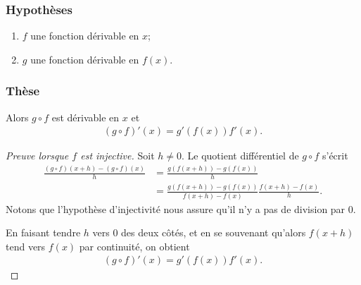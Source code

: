 \documentclass[main.tex]{subfiles}
\begin{document}
\begin{proposition}

    \subsubsection{Hypothèses}

    \begin{enumerate}
        \item $f$ une fonction dérivable en $x$;
        \item $g$ une fonction dérivable en $f(x)$.
    \end{enumerate}

    \subsubsection{Thèse}

    Alors $g \circ f$ est dérivable en $x$ et
    \begin{align}
        (g \circ f)'(x) = g'(f(x)) f'(x).
    \end{align}
\end{proposition}
\begin{proof}[Preuve lorsque $f$ est injective]
    Soit $h \neq 0$.
    Le quotient différentiel de $g \circ f$ s'écrit
    \begin{align}
        \frac {(g \circ f)(x + h) - (g \circ f)(x)} h
        &= \frac {g(f(x + h)) - g(f(x))} h\\
        &= \frac {g(f(x + h)) - g(f(x))} {f(x + h) - f(x)} \frac {f(x + h) - f(x)} h.
    \end{align}
    Notons que l'hypothèse d'injectivité nous assure qu'il n'y a pas de division par $0$.

    En faisant tendre $h$ vers $0$ des deux côtés,
    et en se souvenant qu'alors $f(x + h)$ tend vers $f(x)$ par continuité,
    on obtient
    \begin{align}
        (g \circ f)'(x) = g'(f(x)) f'(x).
    \end{align}
\end{proof}
\end{document}
